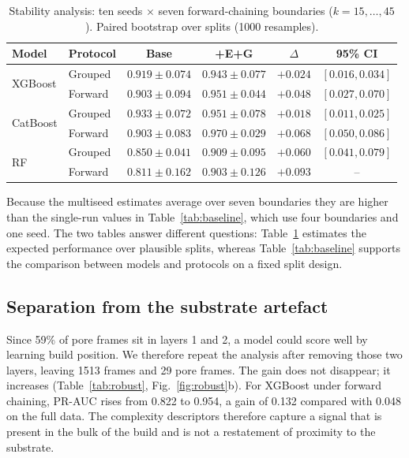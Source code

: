 \documentclass[preprint,12pt]{elsarticle}
\begin{document}
\begin{table}[t]
\centering
\small\setlength{\tabcolsep}{4pt}
\caption{Stability analysis: ten seeds $\times$ seven forward-chaining boundaries ($k=15,\dots,45$). Paired bootstrap over splits (1000 resamples).}
\label{tab:multiseed}
\small
\begin{tabular}{llcccc}
\toprule
Model & Protocol & Base & +E+G & $\Delta$ & 95\% CI \\
\midrule
\multirow{2}{*}{XGBoost}  & Grouped & $0.919\pm0.074$ & $0.943\pm0.077$ & $+0.024$ & $[0.016, 0.034]$ \\
                          & Forward & $0.903\pm0.094$ & $0.951\pm0.044$ & $+0.048$ & $[0.027, 0.070]$ \\
\multirow{2}{*}{CatBoost} & Grouped & $0.933\pm0.072$ & $0.951\pm0.078$ & $+0.018$ & $[0.011, 0.025]$ \\
                          & Forward & $0.903\pm0.083$ & $\mathbf{0.970\pm0.029}$ & $\mathbf{+0.068}$ & $[0.050, 0.086]$ \\
\multirow{2}{*}{RF} & Grouped & $0.850\pm0.041$ & $0.909\pm0.095$ & $+0.060$ & $[0.041, 0.079]$ \\
                          & Forward & $0.811\pm0.162$ & $0.903\pm0.126$ & $+0.093$ & -- \\
\bottomrule
\end{tabular}
\end{table}

Because the multiseed estimates average over seven boundaries they are higher than the single-run values in Table~\ref{tab:baseline}, which use four boundaries and one seed. The two tables answer different questions: Table~\ref{tab:multiseed} estimates the expected performance over plausible splits, whereas Table~\ref{tab:baseline} supports the comparison between models and protocols on a fixed split design.

\subsection{Separation from the substrate artefact}
\label{sec:robust}

Since 59\% of pore frames sit in layers 1 and 2, a model could score well by learning build position. We therefore repeat the analysis after removing those two layers, leaving 1513 frames and 29 pore frames. The gain does not disappear; it increases (Table~\ref{tab:robust}, Fig.~\ref{fig:robust}b). For XGBoost under forward chaining, PR-AUC rises from 0.822 to 0.954, a gain of 0.132 compared with 0.048 on the full data. The complexity descriptors therefore capture a signal that is present in the bulk of the build and is not a restatement of proximity to the substrate.
\end{document}
